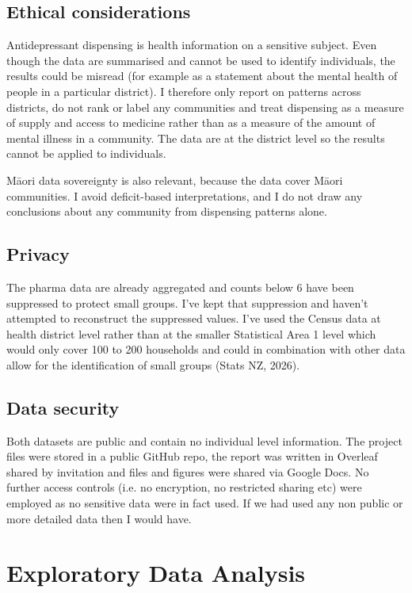 \documentclass[11pt,a4paper]{article}
\begin{document}
\subsection{Ethical considerations}
Antidepressant dispensing is health information on a sensitive subject. Even though the data
are summarised and cannot be used to identify individuals, the results could be misread (for example as a statement about the mental health of people in a particular district). I therefore only report on patterns across districts, do not rank or label any communities and treat dispensing as a measure of supply and access to medicine rather than as a measure of the amount of mental illness in a community. The data are at the district level so the results cannot be applied to individuals.

M\={a}ori data sovereignty is also relevant, because the data cover M\={a}ori communities. I avoid
deficit-based interpretations, and I do not draw any conclusions about any community from dispensing patterns alone.

\subsection{Privacy}
The pharma data are already aggregated and counts below 6 have been suppressed to protect small groups. I've kept that suppression and haven't attempted to reconstruct the suppressed values. I've used the Census data at health district level rather than at the smaller Statistical Area 1 level which would only cover 100 to 200 households and could in combination with other data allow for the identification of small groups (Stats NZ, 2026)\cite{sa1}.

\subsection{Data security}
Both datasets are public and contain no individual level information. The project files were stored in a public GitHub repo, the report was written in Overleaf shared by invitation and files and figures were shared via Google Docs. No further access controls (i.e. no encryption, no restricted sharing etc) were employed as no sensitive data were in fact used. If we had used any non public or more detailed data then I would have.

\section{Exploratory Data Analysis}
\end{document}
